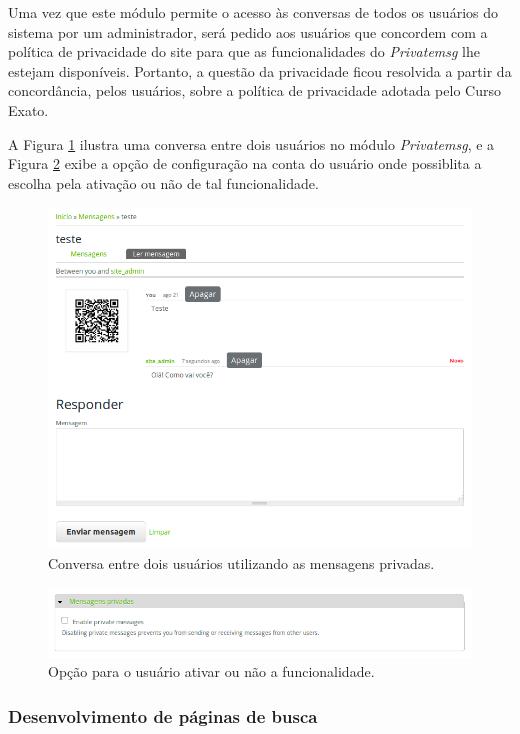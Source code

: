 \documentclass[a4paper]{article}
\begin{document}
Uma vez que este módulo permite o acesso às conversas de todos os usuários do sistema por um administrador, será pedido aos usuários que concordem com a política de privacidade do site para que as funcionalidades do \textit{Privatemsg} lhe estejam disponíveis. Portanto, a questão da privacidade ficou resolvida a partir da concordância, pelos usuários, sobre a política de privacidade adotada pelo Curso Exato.

A Figura \ref{privatemsg} ilustra uma conversa entre dois usuários no módulo \textit{Privatemsg}, e a Figura \ref{pvtmsg-config} exibe a opção de configuração na conta do usuário onde possiblita a escolha pela ativação ou não de tal funcionalidade.

\begin{figure}[pbth!]
\centering
\includegraphics[width=120mm]{img/privatemsg.png}
\caption{Conversa entre dois usuários utilizando as mensagens privadas.\label{privatemsg}}
\end{figure}

\begin{figure}[pbth!]
\centering
\includegraphics[width=120mm]{img/privatemsg-config.png}
\caption{Opção para o usuário ativar ou não a funcionalidade.\label{pvtmsg-config}}
\end{figure}


\subsubsection{Desenvolvimento de páginas de busca}
\end{document}
